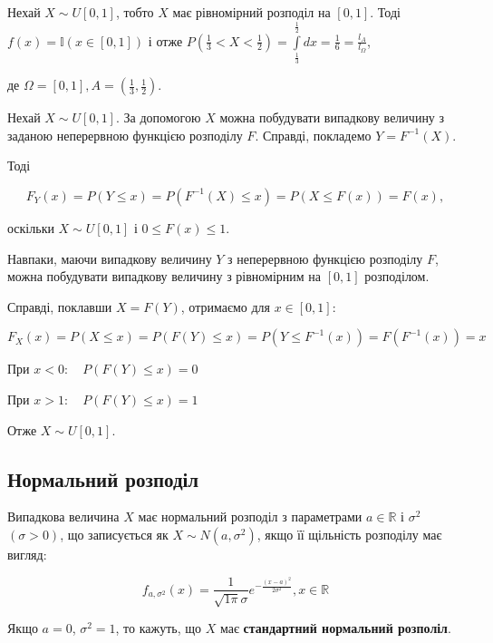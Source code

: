 \beautifulImage

\begin{example}
    Нехай $X \sim U[0, 1]$, тобто $X$ має рівномірний розподіл на $[0, 1]$.
    Тоді $f(x) = \mathbb{I}(x \in [0, 1])$ і отже
    $P(\frac{1}{3} < X < \frac{1}{2}) = \int\limits_{\frac{1}{3}}^{\frac{1}{2}} dx = \frac{1}{6} = \frac{l_A}{l_{\Omega}}$, 
    
    де $\Omega = [0, 1], A = (\frac{1}{3}, \frac{1}{2})$.
    
    \beautifulImage
\end{example}

Нехай $X \sim U[0, 1]$. За допомогою $X$ можна побудувати випадкову величину з
заданою неперервною функцією розподілу $F$. Справді, покладемо $Y = F^{-1}(X)$.

Тоді 

$$F_Y(x) = P(Y \leqslant x)
= P(F^{-1}(X) \leqslant x)
= P(X \leqslant F(x))
= F(x),$$

оскільки $X \sim U[0, 1]$ і $0 \leqslant F(x) \leqslant 1$.

Навпаки, маючи випадкову величину $Y$ з неперервною функцією розподілу
$F$, можна побудувати випадкову величину з рівномірним на $[0, 1]$
розподілом.

Справді, поклавши $X = F(Y)$, отримаємо для $x \in [0, 1]$:

$$F_X(x) = P(X \leqslant x)
= P(F(Y) \leqslant x)
= P(Y \leqslant F^{-1}(x))
= F(F^{-1}(x))
= x$$

При $x < 0: \quad P(F(Y) \leqslant x) = 0$

При $x > 1: \quad P(F(Y) \leqslant x) = 1$

Отже $X \sim U[0, 1]$.

\subsection{Нормальний розподіл}

Випадкова величина $X$ має нормальний розподіл з параметрами $a \in \mathbb{R}$
і $\sigma^2$ $(\sigma > 0)$, що записується як $X \sim N(a, \sigma^2)$,
якщо її щільність розподілу має вигляд:

\begin{equation}
    f_{a, \sigma^2}(x) = \frac{1}{\sqrt{1\pi} \sigma} e^{-\frac{(x-a)^2}{2\sigma^2}},
    x \in \mathbb{R}
\end{equation}

Якщо $a = 0$, $\sigma^2 = 1$, то кажуть, що $X$ має \textbf{стандартний нормальний розполіл}.

